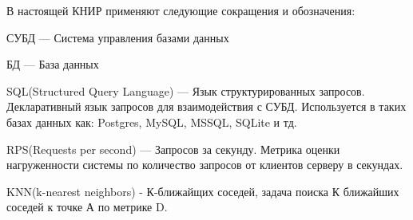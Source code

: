 \Abbreviations %
В настоящей КНИР применяют следующие сокращения и обозначения:

\noindent СУБД --- Система управления базами данных

\noindent БД --- База данных

\noindent SQL(Structured Query Language) --- Язык структурированных запросов. Декларативный язык запросов для взаимодействия с СУБД. Используется в таких базах данных как: Postgres, MySQL, MSSQL, SQLite и тд.

\noindent RPS(Requests per second) --- Запросов за секунду. Метрика оценки нагруженности системы по количество запросов от клиентов серверу в секундах.

\noindent KNN(k-nearest neighbors) - К-ближайщих соседей, задача поиска К ближайших соседей к точке А по метрике D.


